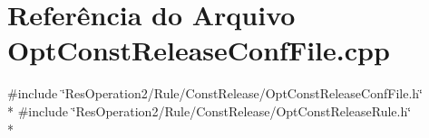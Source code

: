 \section{Referência do Arquivo Opt\+Const\+Release\+Conf\+File.\+cpp}
\label{_opt_const_release_conf_file_8cpp}
{\ttfamily \#include \char`\"{}Res\+Operation2/\+Rule/\+Const\+Release/\+Opt\+Const\+Release\+Conf\+File.\+h\char`\"{}}\\*
{\ttfamily \#include \char`\"{}Res\+Operation2/\+Rule/\+Const\+Release/\+Opt\+Const\+Release\+Rule.\+h\char`\"{}}\\*

